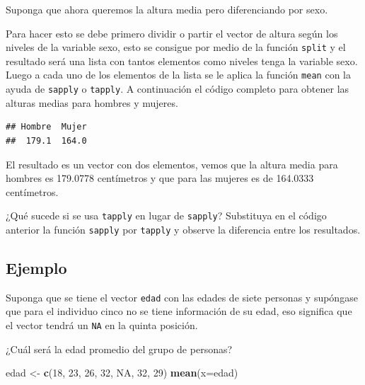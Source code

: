 \documentclass[10pt,]{krantz}
\makeatletter
\newenvironment{Shaded}{\begin{snugshade}}{\end{snugshade}}
\newcommand{\KeywordTok}[1]{\textcolor[rgb]{0.13,0.29,0.53}{\textbf{#1}}}
\newcommand{\DataTypeTok}[1]{\textcolor[rgb]{0.13,0.29,0.53}{#1}}
\newcommand{\DecValTok}[1]{\textcolor[rgb]{0.00,0.00,0.81}{#1}}
\newcommand{\StringTok}[1]{\textcolor[rgb]{0.31,0.60,0.02}{#1}}
\newcommand{\OtherTok}[1]{\textcolor[rgb]{0.56,0.35,0.01}{#1}}
\newcommand{\OperatorTok}[1]{\textcolor[rgb]{0.81,0.36,0.00}{\textbf{#1}}}
\newcommand{\NormalTok}[1]{#1}
\newenvironment{kframe}{%
\medskip{}
\setlength{\fboxsep}{.8em}
 \def\at@end@of@kframe{}%
 \ifinner\ifhmode%
  \def\at@end@of@kframe{\end{minipage}}%
  \begin{minipage}{\columnwidth}%
 \fi\fi%
 \def\FrameCommand##1{\hskip\@totalleftmargin \hskip-\fboxsep
 \colorbox{shadecolor}{##1}\hskip-\fboxsep
     \hskip-\linewidth \hskip-\@totalleftmargin \hskip\columnwidth}%
 \MakeFramed {\advance\hsize-\width
   \@totalleftmargin\z@ \linewidth\hsize
   \@setminipage}}%
 {\par\unskip\endMakeFramed%
 \at@end@of@kframe}
\renewenvironment{Shaded}{\begin{kframe}}{\end{kframe}}
\makeatother
\begin{document}
Suponga que ahora queremos la altura media pero diferenciando por sexo.

Para hacer esto se debe primero dividir o partir el vector de altura
según los niveles de la variable sexo, esto se consigue por medio de la
función \texttt{split} y el resultado será una lista con tantos
elementos como niveles tenga la variable sexo. Luego a cada uno de los
elementos de la lista se le aplica la función \texttt{mean} con la ayuda
de \texttt{sapply} o \texttt{tapply}. A continuación el código completo
para obtener las alturas medias para hombres y mujeres.

\begin{Shaded}
\end{Shaded}

\begin{verbatim}
## Hombre  Mujer 
##  179.1  164.0
\end{verbatim}

El resultado es un vector con dos elementos, vemos que la altura media
para hombres es 179.0778 centímetros y que para las mujeres es de
164.0333 centímetros.

¿Qué sucede si se usa \texttt{tapply} en lugar de \texttt{sapply}?
Substituya en el código anterior la función \texttt{sapply} por
\texttt{tapply} y observe la diferencia entre los resultados.

\subsection*{Ejemplo}\label{ejemplo-32}


Suponga que se tiene el vector \texttt{edad} con las edades de siete
personas y supóngase que para el individuo cinco no se tiene información
de su edad, eso significa que el vector tendrá un \texttt{NA} en la
quinta posición.

¿Cuál será la edad promedio del grupo de personas?

\begin{Shaded}
\begin{Highlighting}[]
\NormalTok{edad <-}\StringTok{ }\KeywordTok{c}\NormalTok{(}\DecValTok{18}\NormalTok{, }\DecValTok{23}\NormalTok{, }\DecValTok{26}\NormalTok{, }\DecValTok{32}\NormalTok{, }\OtherTok{NA}\NormalTok{, }\DecValTok{32}\NormalTok{, }\DecValTok{29}\NormalTok{)}
\KeywordTok{mean}\NormalTok{(}\DataTypeTok{x=}\NormalTok{edad)}
\end{Highlighting}
\end{Shaded}
\end{document}
